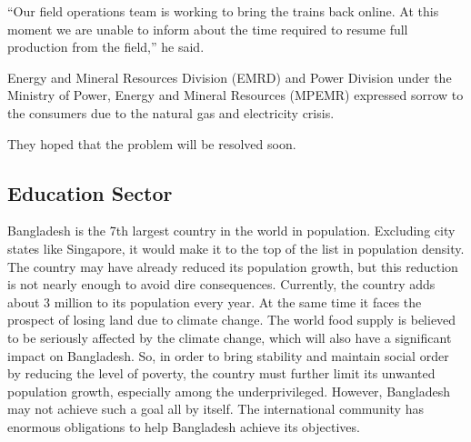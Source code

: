 \documentclass[a4paper,12pt]{article}
\begin{document}
“Our field operations team is working to bring the trains back online. At this moment we are unable to inform about the time required to resume full production from the field,” he said.

Energy and Mineral Resources Division (EMRD) and Power Division under the Ministry of Power, Energy and Mineral Resources (MPEMR) expressed sorrow to the consumers due to the natural gas and electricity crisis.

They hoped that the problem will be resolved soon.

\subsection{Education Sector}
Bangladesh is the 7th largest country in the world in population. Excluding city states like Singapore, it would make it to the top of the list in population density. The country may have already reduced its population growth, but this reduction is not nearly enough to avoid dire consequences. Currently, the country adds about 3 million to its population every year. At the same time it faces the prospect of losing land due to climate change. The world food supply is believed to be seriously affected by the climate change, which will also have a significant impact on Bangladesh. So, in order to bring stability and maintain social order by reducing the level of poverty, the country must further limit its unwanted population growth, especially among the underprivileged. However, Bangladesh may not achieve such a goal all by itself. The international community has enormous obligations to help Bangladesh achieve its objectives.
\end{document}
